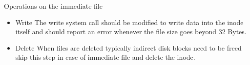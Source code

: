 \documentclass{beamer}
\begin{document}
\begin{frame}{Operations on the immediate file}
\begin{itemize}
\item Write \linebreak
The write system call should be modified to write data into the inode itself and should report an error whenever the file size goes beyond 32 Bytes.\linebreak
\item Delete	\linebreak
When files are deleted typically indirect disk blocks need to be freed skip this step in case of immediate file and delete the inode. \linebreak
\end{itemize}
\end{frame}









%
\end{document}
